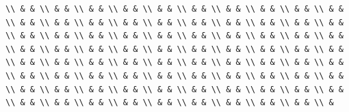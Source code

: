 \documentclass[
]{article}
\begin{document}
{{\begin{verbatim}
\\ & & \\ & & \\ & & \\ & & \\ & & \\ & & \\ & & \\ & & \\ & & \\ & & \\ & & \\ & & \\ & & \\ & & \\ & & \\ & & \\ & & \\ & & \\ & & \\ & & \\ & & \\ & & \\ & & \\ & & \\ & & \\ & & \\ & & \\ & & \\ & & \\ & & \\ & & \\ & & \\ & & \\ & & \\ & & \\ & & \\ & & \\ & & \\ & & \\ & & \\ & & \\ & & \\ & & \\ & & \\ & & \\ & & \\ & & \\ & & \\ & & \\ & & \\ & & \\ & & \\ & & \\ & & \\ & & \\ & & \\ & & \\ & & \\ & & \\ & & \\ & & \\ & & \\ & & \\ & & \\ & & \\ & & \\ & & \\ & & \\ & & \\ & & \\ & & \\ & & \\ & & \\ & & \\ & & \\ & & \\ & & \\ & & \\ & & \\ &
\end{verbatim}}}
\end{document}

